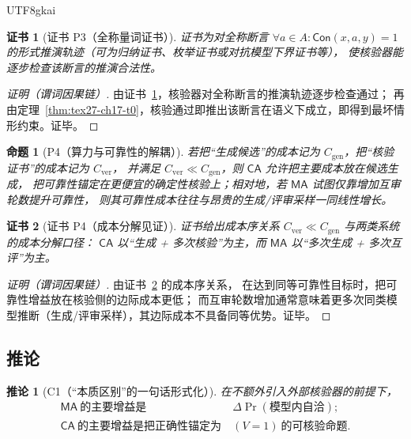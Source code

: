 \documentclass[12pt]{article}
\newtheorem{proposition}{命题}[section]
\newtheorem{corollary}{推论}[section]
\newtheorem{Certificate}{证书}[section]
\begin{document}
\begin{CJK*}{UTF8}{gkai}
\begin{Certificate}[证书 P3（全称量词证书）]
\label{cert:tex27-ch17-p3}
证书为对全称断言 $\forall a\in A:\mathsf{Con}(x,a,y)=1$ 的形式推演轨迹（可为归纳证书、枚举证书或对抗模型下界证书等），
使核验器能逐步检查该断言的推演合法性。
\end{Certificate}

\begin{proof}[证明（谓词因果链）]
由证书~\ref{cert:tex27-ch17-p3}，核验器对全称断言的推演轨迹逐步检查通过；
再由定理~\ref{thm:tex27-ch17-t0}，核验通过即推出该断言在语义下成立，即得到最坏情形约束。证毕。
\end{proof}

\begin{proposition}[P4（算力与可靠性的解耦）]
\label{prop:tex27-ch17-p4}
若把“生成候选”的成本记为 $C_{\mathrm{gen}}$，把“核验证书”的成本记为 $C_{\mathrm{ver}}$，
并满足 $C_{\mathrm{ver}}\ll C_{\mathrm{gen}}$，则 $\mathsf{CA}$ 允许把主要成本放在候选生成，
把可靠性锚定在更便宜的确定性核验上；相对地，若 $\mathsf{MA}$ 试图仅靠增加互审轮数提升可靠性，
则其可靠性成本往往与昂贵的生成/评审采样一同线性增长。
\end{proposition}

\begin{Certificate}[证书 P4（成本分解见证）]
\label{cert:tex27-ch17-p4}
证书给出成本序关系 $C_{\mathrm{ver}}\ll C_{\mathrm{gen}}$ 与两类系统的成本分解口径：
$\mathsf{CA}$ 以“生成 + 多次核验”为主，而 $\mathsf{MA}$ 以“多次生成 + 多次互评”为主。
\end{Certificate}

\begin{proof}[证明（谓词因果链）]
由证书~\ref{cert:tex27-ch17-p4} 的成本序关系，
在达到同等可靠性目标时，把可靠性增益放在核验侧的边际成本更低；
而互审轮数增加通常意味着更多次同类模型推断（生成/评审采样），其边际成本不具备同等优势。证毕。
\end{proof}

\subsection{推论}
\label{subsec:tex27-ch17-corollaries}

\begin{corollary}[C1（“本质区别”的一句话形式化）]
\label{cor:tex27-ch17-c1}
在不额外引入外部核验器的前提下，
\[
  \begin{aligned}
    \mathsf{MA}\ \text{的主要增益是}\ &\Delta\Pr(\text{模型内自洽});\\
    \mathsf{CA}\ \text{的主要增益是把正确性锚定为}\ &(V=1)\ \text{的可核验命题}.
  \end{aligned}
\]
\end{corollary}


\end{CJK*}
\end{document}

